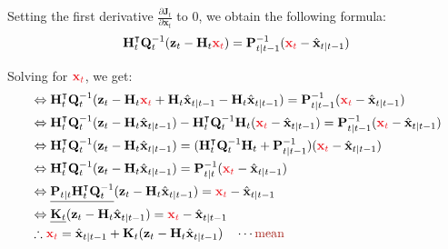 \documentclass[10pt]{article}
\begin{document}
Setting the first derivative $\frac{\partial \mathbf{J}_t}{\partial \mathbf{x}_{t}}$ to 0, we obtain the following formula:
\begin{equation}
	\begin{aligned}
		\mathbf{H}_t^{\intercal}\mathbf{Q}_t^{-1}(\mathbf{z}_t - \mathbf{H}_t {\color{Red} \mathbf{x}_{t} }) = \mathbf{P}_{t|t-1}^{-1}({\color{Red}\mathbf{x}_{t} } - \hat{\mathbf{x}}_{t|t-1})
	\end{aligned}
\end{equation}

Solving for ${\color{Red} \mathbf{x}_{t} }$, we get:
\begin{equation} \label{eq:derivkf5}
	\begin{aligned}
		& \Leftrightarrow \mathbf{H}_t^{\intercal}\mathbf{Q}_t^{-1}(\mathbf{z}_t - \mathbf{H}_t {\color{Red} \mathbf{x}_{t} } + \mathbf{H}_t\hat{\mathbf{x}}_{t|t-1} - \mathbf{H}_t \hat{\mathbf{x}}_{t|t-1}) = \mathbf{P}_{t|t-1}^{-1}({\color{Red}\mathbf{x}_{t} } - \hat{\mathbf{x}}_{t|t-1}) \\
		& \Leftrightarrow \mathbf{H}_t^{\intercal}\mathbf{Q}_t^{-1}(\mathbf{z}_t -   \mathbf{H}_t \hat{\mathbf{x}}_{t|t-1}) - \mathbf{H}_t^{\intercal}\mathbf{Q}_t^{-1}\mathbf{H}_t({\color{Red}\mathbf{x}_t } - \hat{\mathbf{x}}_{t|t-1}) = \mathbf{P}_{t|t-1}^{-1}({\color{Red}\mathbf{x}_{t} } - \hat{\mathbf{x}}_{t|t-1}) \\ 
		& \Leftrightarrow \mathbf{H}_t^{\intercal}\mathbf{Q}_t^{-1}(\mathbf{z}_t -   \mathbf{H}_t \hat{\mathbf{x}}_{t|t-1})  = (\mathbf{H}_t^{\intercal}\mathbf{Q}_t^{-1}\mathbf{H}_t + \mathbf{P}_{t|t-1}^{-1})({\color{Red}\mathbf{x}_{t} } - \hat{\mathbf{x}}_{t|t-1}) \\
		& \Leftrightarrow \mathbf{H}_t^{\intercal}\mathbf{Q}_t^{-1}(\mathbf{z}_t -   \mathbf{H}_t \hat{\mathbf{x}}_{t|t-1})  = \mathbf{P}_{t|t}^{-1}({\color{Red}\mathbf{x}_{t} } - \hat{\mathbf{x}}_{t|t-1}) \\
		& \Leftrightarrow \underline{ \mathbf{P}_{t|t}\mathbf{H}_t^{\intercal}\mathbf{Q}_t^{-1} } (\mathbf{z}_t -   \mathbf{H}_t \hat{\mathbf{x}}_{t|t-1})  = {\color{Red}\mathbf{x}_{t} } - \hat{\mathbf{x}}_{t|t-1} \\
		& \Leftrightarrow \underline{ \mathbf{K}_t } (\mathbf{z}_t -   \mathbf{H}_t \hat{\mathbf{x}}_{t|t-1})  = {\color{Red}\mathbf{x}_{t} } - \hat{\mathbf{x}}_{t|t-1} \\
		& \therefore {\color{Red}\mathbf{x}_{t} } =  \hat{\mathbf{x}}_{t|t-1} + \mathbf{K}_t(\mathbf{z}_t -   \mathbf{H}_t \hat{\mathbf{x}}_{t|t-1})  \quad \cdots {\color{Mahogany} \text{mean} }
	\end{aligned}
\end{equation}
\end{document}
